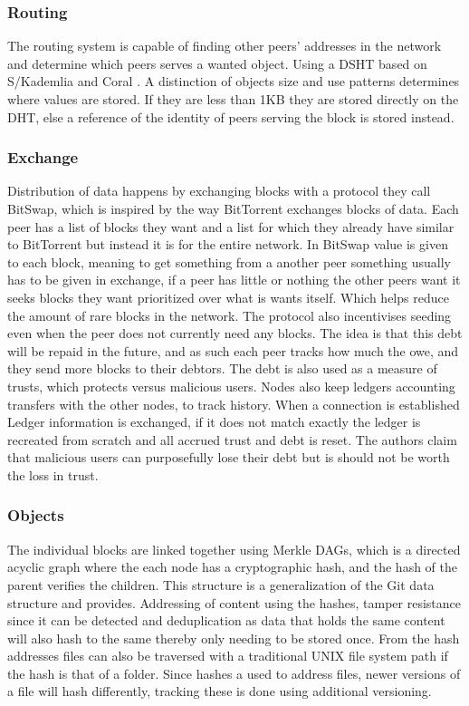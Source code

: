 \subsubsection{Routing}
The routing system is capable of finding other peers' addresses in the network and determine which peers serves a wanted object. Using a \acs{DSHT} based on S/Kademlia and Coral \cite{baumgart2007skademlia, freedman2004coral}. A distinction of objects size and use patterns determines where values are stored. If they are less than 1KB they are stored directly on the \acs{DHT}, else a reference of the identity of peers serving the block is stored instead. 

\subsubsection{Exchange}
Distribution of data happens by exchanging blocks with a protocol they call BitSwap, which is inspired by the way BitTorrent exchanges blocks of data. Each peer has a list of blocks they want and a list for which they already have similar to BitTorrent but instead it is for the entire network. In BitSwap value is given to each block, meaning to get something from a another peer something usually has to be given in exchange, if a peer has little or nothing the other peers want it seeks blocks they want prioritized over what is wants itself. Which helps reduce the amount of rare blocks in the network.
The protocol also incentivises seeding even when the peer does not currently need any blocks. The idea is that this debt will be repaid in the future, and as such each peer tracks how much the owe, and they send more blocks to their debtors. The debt is also used as a measure of trusts, which protects versus malicious users.
Nodes also keep ledgers accounting transfers with the other nodes, to track history. When a connection is established Ledger information is exchanged, if it does not match exactly the ledger is recreated from scratch and all accrued trust and debt is reset. The authors claim that malicious users can purposefully lose their debt but is should not be worth the loss in trust.

\subsubsection{Objects}
The individual blocks are linked together using Merkle \acs{DAG}s, which is a directed acyclic graph where the each node has a cryptographic hash, and the hash of the parent verifies the children. This structure is a generalization of the Git data structure and provides. Addressing of content using the hashes, tamper resistance since it can be detected and deduplication as data that holds the same content will also hash to the same thereby only needing to be stored once. From the hash addresses files can also be traversed with a traditional UNIX file system path if the hash is that of a folder.
Since hashes a used to address files, newer versions of a file will hash differently, tracking these is done using additional versioning.


